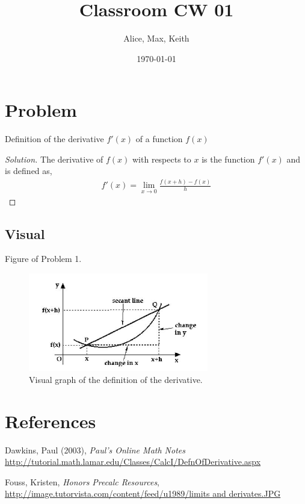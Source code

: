 \documentclass[aps,pra,notitlepage,amsmath,amssymb,letterpaper,12pt]{revtex4-1}
\newenvironment{problem}[2][Problem]{\begin{trivlist}
\item[\hskip \labelsep {\bfseries #1}\hskip \labelsep {\bfseries #2.}]}{\end{trivlist}}
\newenvironment{solution}{\begin{proof}[Solution]}{\end{proof}}
\begin{document}
 
\title{Classroom CW 01}
\author{Alice, Max, Keith}
\date{\today}

\maketitle

\section{Problem} %

\begin{problem}{1} 
Definition of the derivative $f'(x)$ of a function $f(x)$
\end{problem}

\begin{solution} %
The derivative of $f(x)$ with respects to $x$ is the function $f'(x)$ and is defined as,
\begin{align}
f'(x) = \lim\limits_{x \to 0}\frac{f(x+h)-f(x)}{h}
\end{align}
\end{solution}

\subsection{Visual} %

Figure of Problem 1.

\begin{figure}[h!] %
  \includegraphics[width=0.7\textwidth]{limits_and_derivates.JPG}  %
  \caption{Visual graph of the definition of the derivative.}
  \label{fig:figlabel}
\end{figure}

\section{References}
\noindent Dawkins, Paul (2003), \textit{Paul's Online Math Notes}
\url {http://tutorial.math.lamar.edu/Classes/CalcI/DefnOfDerivative.aspx}

\noindent Fouss, Kristen, \textit{Honors Precalc Resources}, \url{http://image.tutorvista.com/content/feed/u1989/limits and derivates.JPG}

 
\end{document}
